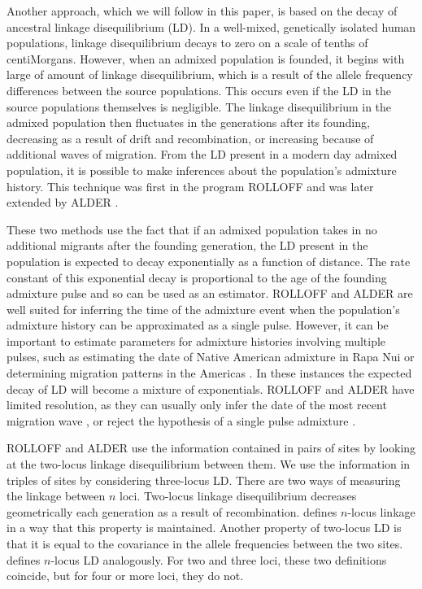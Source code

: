 Another approach, which we will follow in this paper, is based on the decay of ancestral linkage disequilibrium (LD). In a well-mixed, genetically isolated human populations, linkage disequilibrium decays to zero on a scale of tenths of centiMorgans. However, when an admixed population is founded, it begins with large of amount of linkage disequilibrium, which is a result of the allele frequency differences between the source populations. This occurs even if the LD in the source populations themselves is negligible. The linkage disequilibrium in the admixed population then fluctuates in the generations after its founding, decreasing as a result of drift and recombination, or increasing because of additional waves of migration. From the LD present in a modern day admixed population, it is possible to make inferences about the population's admixture history. This technique was first in the program ROLLOFF \cite{moorjani2011history} and was later extended by ALDER \cite{loh2013inferring}. 

These two methods use the fact that if an admixed population takes in no additional migrants after the founding generation, the LD present in the population is expected to decay exponentially as a function of distance. The rate constant of this exponential decay is proportional to the age of the founding admixture pulse and so can be used as an estimator. ROLLOFF and ALDER are well suited for inferring the time of the admixture event when the population's admixture history can be approximated as a single pulse. However, it can be important to estimate parameters for admixture histories involving multiple pulses, such as estimating the date of Native American admixture in Rapa Nui \cite{moreno2014genome} or determining migration patterns in the Americas \cite{gravel2013reconstructing}. In these instances the expected decay of LD will become a mixture of exponentials. ROLLOFF and ALDER have limited resolution, as they can usually only infer the date of the most recent migration wave \cite{moorjani2011history}, or reject the hypothesis of a single pulse admixture \cite{loh2013inferring}. 

ROLLOFF and ALDER use the information contained in pairs of sites by looking at the two-locus linkage disequilibrium between them. We use the information in triples of sites by considering three-locus LD. There are two ways of measuring the linkage between $n$ loci. Two-locus linkage disequilibrium decreases geometrically each generation as a result of recombination. \cite{bennett1952theory} defines $n$-locus linkage in a way that this property is maintained. Another property of two-locus LD is that it is equal to the covariance in the allele frequencies between the two sites. \cite{slatkin1972treating} defines $n$-locus LD analogously. For two and three loci, these two definitions coincide, but for four or more loci, they do not. 

